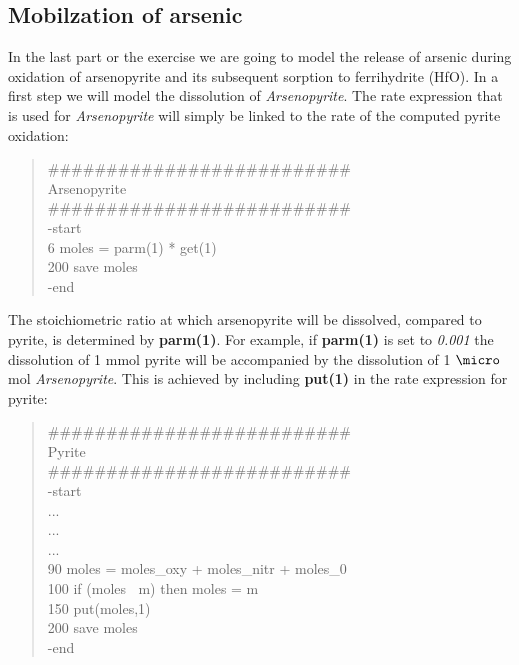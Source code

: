 \subsection[Mobilzation of arsenic]{Mobilzation of arsenic}

In the last part or the exercise we are going to model the release of arsenic during oxidation of arsenopyrite
and its subsequent sorption to ferrihydrite (HfO). In a first step we will model
the dissolution of \emph{Arsenopyrite}. 
The rate expression that is used for \emph{Arsenopyrite} will simply be linked
to the rate of the computed pyrite oxidation:

{\color{red}
\begin{quote}
\#\#\#\#\#\#\#\#\#\#\#\#\#\#\#\#\#\#\#\#\#\#\#\#\#\#\\
Arsenopyrite \\
\#\#\#\#\#\#\#\#\#\#\#\#\#\#\#\#\#\#\#\#\#\#\#\#\#\#\\
-start \\
  6 moles = parm(1) * get(1) \\
200 save moles \\
-end \\
\end{quote}}

The stoichiometric ratio at which arsenopyrite will be dissolved, compared to pyrite, is determined
by {\color{red} \textbf{parm(1)}}. For example, if {\color{red} \textbf{parm(1)}} is set to
\emph{0.001} the dissolution of 1 mmol pyrite will be accompanied by 
the dissolution of 1 $\micro$mol \emph{Arsenopyrite}.   
This is achieved by including {\color{red} \textbf{put(1)}}
in the rate expression for pyrite:

{\color{red}
\begin{quote}
\#\#\#\#\#\#\#\#\#\#\#\#\#\#\#\#\#\#\#\#\#\#\#\#\#\# \\
Pyrite \\
\#\#\#\#\#\#\#\#\#\#\#\#\#\#\#\#\#\#\#\#\#\#\#\#\#\# \\
-start \\
... \\
... \\
... \\
90 moles = moles\_oxy + moles\_nitr + moles\_0 \\
100 if (moles $\>$ m) then moles = m \\
150 put(moles,1) \\
200 save moles \\
-end \\
\end{quote}}

